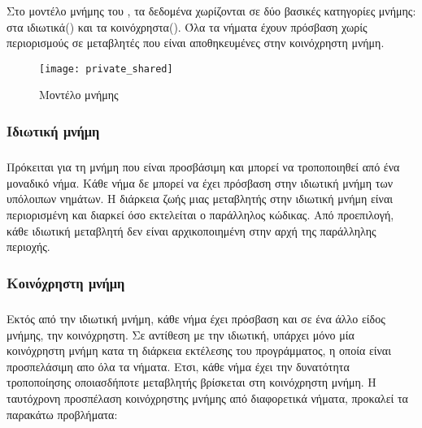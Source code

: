 Στο μοντέλο μνήμης του , τα δεδομένα χωρίζονται σε δύο βασικές κατηγορίες μνήμης: στα
ιδιωτικά(\emph{}) και τα κοινόχρηστα(\emph{}).  Όλα τα νήματα έχουν πρόσβαση
χωρίς περιορισμούς σε μεταβλητές που είναι αποθηκευμένες στην κοινόχρηστη μνήμη\cite{thenextstep7}.

\begin{center}
\begin{figure}[h]
\texttt{[image: private\_shared]}
\captionsetup{justification=centering, singlelinecheck=false}
\caption{Μοντέλο μνήμης }
\label{fig:private_shared}
\end{figure}
\end{center}

\subsubsection{Ιδιωτική μνήμη}
\subparagraph{}
Πρόκειται για τη μνήμη που είναι προσβάσιμη και μπορεί να τροποποιηθεί από ένα μοναδικό νήμα. Κάθε
νήμα δε μπορεί να έχει πρόσβαση στην ιδιωτική μνήμη των υπόλοιπων νημάτων. Η διάρκεια ζωής μιας
μεταβλητής στην ιδιωτική μνήμη είναι περιορισμένη και διαρκεί όσο εκτελείται ο παράλληλος κώδικας.
Από προεπιλογή, κάθε ιδιωτική μεταβλητή δεν είναι αρχικοποιημένη στην αρχή της παράλληλης
περιοχής\cite{thenextstep9}.
\clearpage
\subsubsection{Κοινόχρηστη μνήμη}
\subparagraph{}
Εκτός από την ιδιωτική μνήμη, κάθε νήμα έχει πρόσβαση και σε ένα άλλο είδος μνήμης, την
κοινόχρηστη. Σε αντίθεση με την ιδιωτική, υπάρχει μόνο μία κοινόχρηστη μνήμη κατα τη διάρκεια
εκτέλεσης του προγράμματος, η οποία είναι προσπελάσιμη απο όλα τα νήματα. Ετσι, κάθε νήμα έχει την
δυνατότητα τροποποίησης οποιασδήποτε μεταβλητής βρίσκεται στη κοινόχρηστη μνήμη. Η ταυτόχρονη
προσπέλαση κοινόχρηστης μνήμης από διαφορετικά νήματα, προκαλεί τα παρακάτω προβλήματα:

